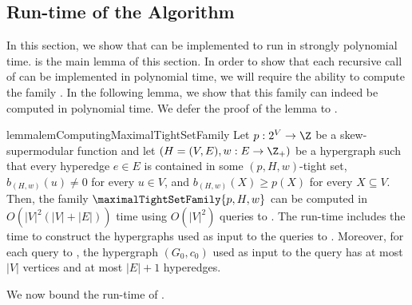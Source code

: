\subsection{Run-time of the Algorithm}
\label{sec:WeakToStrongCover:strongly-poly-runtime:main}
In this section, we show that  can be implemented to run in strongly polynomial time. 
 is the main lemma of this section. 
In order to show that each recursive call of  can be implemented in polynomial time, we will require the ability to compute the family .  
In the following lemma, we show that this family can indeed be computed in polynomial time. We defer the proof of the lemma to .

\begin{restatable}{lemma}{lemComputingMaximalTightSetFamily}\label{lem:FunctionMaximizetionOracles:computing-maximal-pHw-tight-sets-with-p-max-oracle}
 Let $p:2^V\rightarrow\Z$ be a skew-supermodular function and let $\left(H = (V, E), w:E \rightarrow\Z_+\right)$ be a hypergraph such that every hyperedge $e \in E$ is contained in some $(p, H, w)$-tight set, $b_{(H,w)}(u) \not = 0$ for every $u \in V$, and $b_{(H,w)}(X) \geq p(X)$ for every $X \subseteq V$.
Then, the family $\maximalTightSetFamily{p, H, w}$ can be computed in $O(|V|^2(|V|+|E|))$ time using $O(|V|^2)$ queries to . The run-time includes the time to construct the hypergraphs used as input to the queries to . Moreover, for each query to , the hypergraph $(G_0, c_0)$ used as input to the query has at most $|V|$ vertices and at most $|E| + 1$ hyperedges.  \end{restatable}

We now bound the run-time of . 


